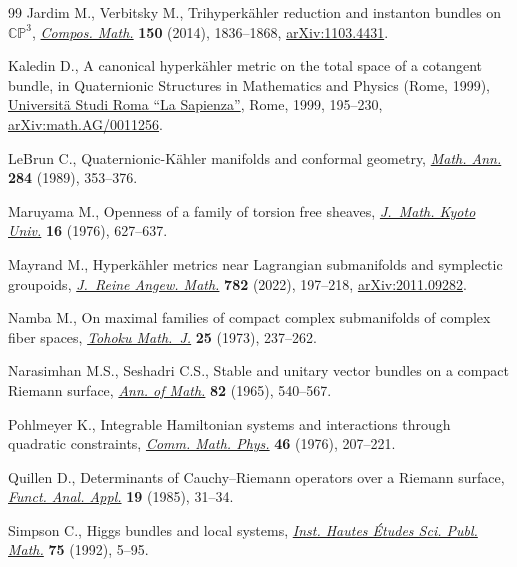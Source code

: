 \documentclass[pdftex]{sigma}
\numberwithin{equation}{section}
\theoremstyle{definition}
\begin{document}
\begin{thebibliography}{99}
Jardim M., Verbitsky M., Trihyperk\"ahler reduction and instanton bundles
 on~{$\mathbb{CP}^3$},
 \href{https://doi.org/10.1112/S0010437X14007477}{\textit{Compos. Math.}}
 \textbf{150} (2014), 1836--1868,
 \href{http://arxiv.org/abs/1103.4431}{arXiv:1103.4431}.

Kaledin D., A canonical hyperk\"ahler metric on the total space of a cotangent
 bundle, in Quaternionic {S}tructures in {M}athematics and {P}hysics ({R}ome,
 1999), \href{https://doi.org/10.1142/4709}{Universit\"a Studi Roma ``La
 Sapienza''}, Rome, 1999, 195--230,
 \href{http://arxiv.org/abs/math.AG/0011256}{arXiv:math.AG/0011256}.

LeBrun C., Quaternionic-{K}\"ahler manifolds and conformal geometry,
 \href{https://doi.org/10.1007/BF01442490}{\textit{Math. Ann.}} \textbf{284}
 (1989), 353--376.

Maruyama M., Openness of a family of torsion free sheaves,
 \href{https://doi.org/10.1215/kjm/1250522875}{\textit{J.~Math. Kyoto Univ.}}
 \textbf{16} (1976), 627--637.

Mayrand M., Hyperk\"ahler metrics near {L}agrangian submanifolds and symplectic
 groupoids, \href{https://doi.org/10.1515/crelle-2021-0059}{\textit{J.~Reine
 Angew. Math.}} \textbf{782} (2022), 197--218,
 \href{http://arxiv.org/abs/2011.09282}{arXiv:2011.09282}.

Namba M., On maximal families of compact complex submanifolds of complex fiber
 spaces, \href{https://doi.org/10.2748/tmj/1178241383}{\textit{Tohoku
 Math.~J.}} \textbf{25} (1973), 237--262.

Narasimhan M.S., Seshadri C.S., Stable and unitary vector bundles on a compact
 {R}iemann surface, \href{https://doi.org/10.2307/1970710}{\textit{Ann. of
 Math.}} \textbf{82} (1965), 540--567.

Pohlmeyer K., Integrable {H}amiltonian systems and interactions through
 quadratic constraints,
 \href{https://doi.org/10.1007/BF01609119}{\textit{Comm. Math. Phys.}}
 \textbf{46} (1976), 207--221.

Quillen D., Determinants of {C}auchy--{R}iemann operators over a Riemann
 surface, \href{https://doi.org/10.1007/BF01086022}{\textit{Funct. Anal.
 Appl.}} \textbf{19} (1985), 31--34.

Simpson C., Higgs bundles and local systems,
 \href{https://doi.org/10.1007/BF02699491}{\textit{Inst. Hautes \'Etudes Sci.
 Publ. Math.}} \textbf{75} (1992), 5--95.


\end{thebibliography}
\end{document}
